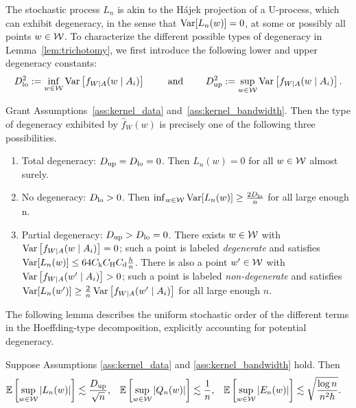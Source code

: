 The stochastic process $L_n$ is akin to the H{\'a}jek projection of a U-process,
which can exhibit degeneracy, in the sense that $\operatorname{Var}[L_n(w)] = 0$, at some
or possibly all points $w \in \mathcal{W}$. To characterize the different possible
types of degeneracy in Lemma~\ref{lem:trichotomy},
we first introduce the following lower and upper degeneracy constants:
%
\begin{align*}
  D_{\textup{lo}}^2 := \inf_{w \in \mathcal{W}} \operatorname{Var}\left[f_{W \mid A}(w \mid A_i)\right]
  \qquad \text{ and } \qquad
  D_{\textup{up}}^2 := \sup_{w \in \mathcal{W}} \operatorname{Var}\left[f_{W \mid A}(w \mid A_i)\right].
\end{align*}
%
\begin{lemma}
  \label{lem:trichotomy}
  Grant Assumptions~\ref{ass:kernel_data} and~\ref{ass:kernel_bandwidth}.
  Then the type of degeneracy exhibited by $\hat f_W(w)$
  is precisely one of the following three possibilities.
  \begin{enumerate}[label=(\roman*)]

    \item Total degeneracy:
      $D_{\textup{up}} = D_{\textup{lo}} = 0$. Then $L_n(w) = 0$ for all $w \in \mathcal{W}$ almost surely.

    \item No degeneracy:
      $D_{\textup{lo}} > 0$. Then $\inf_{w \in \mathcal{W}} \operatorname{Var}[L_n(w)] \geq \frac{2 D_{\textup{lo}}}{n}$
      for all large enough n.

    \item Partial degeneracy:
      $D_{\textup{up}} > D_{\textup{lo}} = 0$. There exists $w \in \mathcal{W}$ with
      $\operatorname{Var}\left[f_{W \mid A}(w \mid A_i)\right] = 0$;
      such a point is labeled \emph{degenerate} and satisfies
      $\operatorname{Var}[L_n(w)] \leq 64 C_{\mathrm{k}} C_{\mathrm{H}} C_{\mathrm{d}} \frac{h}{n}$.
      There is also a point $w' \in \mathcal{W}$ with
      $\operatorname{Var}\left[f_{W \mid A}(w' \mid A_i)\right] > 0$;
      such a point is labeled \emph{non-degenerate} and satisfies
      $\operatorname{Var}[L_n(w')] \geq
      \frac{2}{n} \operatorname{Var}\left[f_{W \mid A}(w' \mid A_i)\right]$
      for all large enough $n$.

  \end{enumerate}

\end{lemma}

The following lemma describes the uniform stochastic order of the different
terms in the Hoeffding-type decomposition, explicitly accounting for potential
degeneracy.

\begin{lemma}
  \label{lem:uniform_concentration}

  Suppose Assumptions \ref{ass:kernel_data} and
  \ref{ass:kernel_bandwidth} hold. Then
  \begin{align*}
    \mathbb{E}\left[ \sup_{w \in \mathcal{W}} |L_n(w)| \right]
    &\lesssim \frac{D_{\textup{up}}}{\sqrt n},
    &\mathbb{E}\left[ \sup_{w \in \mathcal{W}} |Q_n(w)| \right]
    &\lesssim \frac{1}{n},
    &\mathbb{E}\left[ \sup_{w \in \mathcal{W}} |E_n(w)| \right]
    &\lesssim \sqrt{\frac{\log n}{n^2h}}.
  \end{align*}
\end{lemma}

